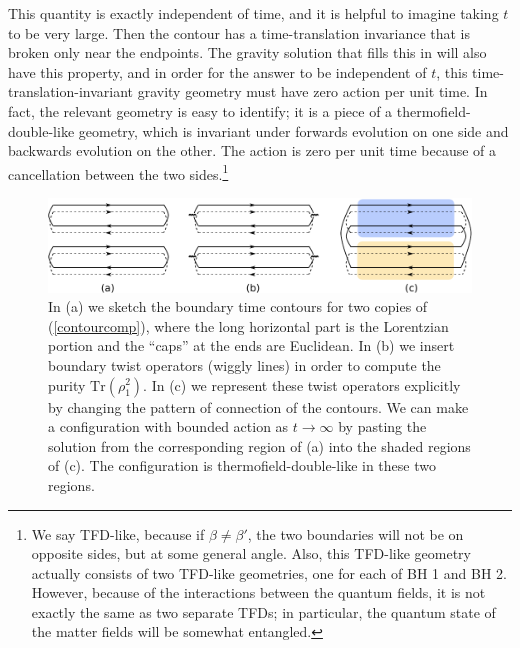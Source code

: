 \documentclass[11pt]{article}
\numberwithin{equation}{section}
\def\tr{\text{Tr}}
\begin{document}
This quantity is exactly independent of time, and it is helpful to imagine taking $t$ to be very large. Then the contour has a time-translation invariance that is broken only near the endpoints. The gravity solution that fills this in will also have this property, and in order for the answer to be independent of $t$, this time-translation-invariant gravity geometry must have zero action per unit time. In fact, the relevant geometry is easy to identify; it is a piece of a thermofield-double-like geometry, which is invariant under forwards evolution on one side and backwards evolution on the other. The action is zero per unit time because of a cancellation between the two sides.\footnote{We say TFD-like, because if $\beta\neq\beta'$, the two boundaries will not be on opposite sides, but at some general angle. Also, this TFD-like geometry actually consists of two TFD-like geometries, one for each of BH 1 and BH 2. However, because of the interactions between the quantum fields, it is not exactly the same as two separate TFDs; in particular, the quantum state of the matter fields will be somewhat entangled.}
\begin{figure}[t]
\begin{center}
\includegraphics[width = .9\textwidth]{images/contours.pdf}
\caption{{\small In (a) we sketch the boundary time contours for two copies of (\ref{contourcomp}), where the long horizontal part is the Lorentzian portion and the ``caps'' at the ends are Euclidean. In (b) we insert boundary twist operators (wiggly lines) in order to compute the purity $\tr(\rho_1^2)$. In (c) we represent these twist operators explicitly by changing the pattern of connection of the contours. We can make a configuration with bounded action as $t\to\infty$ by pasting the solution from the corresponding region of (a) into the shaded regions of (c). The configuration is thermofield-double-like in these two regions.}}\label{fig:contours}
\end{center}
\end{figure}
\end{document}
